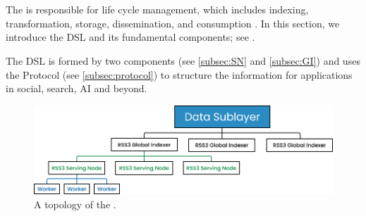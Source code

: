 \section{}
\label{sec:DSL}

The  is responsible for  life cycle management, which includes indexing, transformation, storage, dissemination, and consumption \cite{nationalinstituteofstandardsandtechnology2016Information}.
In this section, we introduce the \gls{DSL} and its fundamental components; see .

The \gls{DSL} is formed by two components (see \cref{subsec:SN} and \cref{subsec:GI}) and uses the \gls{Protocol} (see \cref{subsec:protocol}) to structure the information for applications in social, search, AI and beyond.

    {
        \begin{figure}[tb!]
            \centering
            \includegraphics[width=\columnwidth]{figures/DSL.png}
            \caption{A topology of the .}
            \label{fig:DSL}
        \end{figure}
    }



